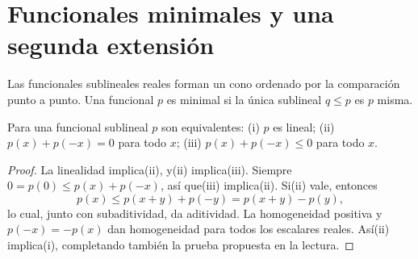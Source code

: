 \section{Funcionales minimales y una segunda extensión}\label{lec:v3-06}
Las funcionales sublineales reales forman un cono ordenado por la comparación punto a punto. Una funcional $p$ es minimal si la única sublineal $q\leq p$ es $p$ misma.
\begin{proposicion}\label{v3:l06-p1}
Para una funcional sublineal $p$ son equivalentes: (i) $p$ es lineal; (ii) $p(x)+p(-x)=0$ para todo $x$; (iii) $p(x)+p(-x)\leq0$ para todo $x$.
\end{proposicion}
\begin{proof}
La linealidad implica(ii), y(ii) implica(iii). Siempre $0=p(0)\leq p(x)+p(-x)$, así que(iii) implica(ii). Si(ii) vale, entonces
\[
 p(x)\leq p(x+y)+p(-y)=p(x+y)-p(y),
\]
lo cual, junto con subaditividad, da aditividad. La homogeneidad positiva y $p(-x)=-p(x)$ dan homogeneidad para todos los escalares reales. Así(ii) implica(i), completando también la prueba propuesta en la lectura.
\end{proof}

